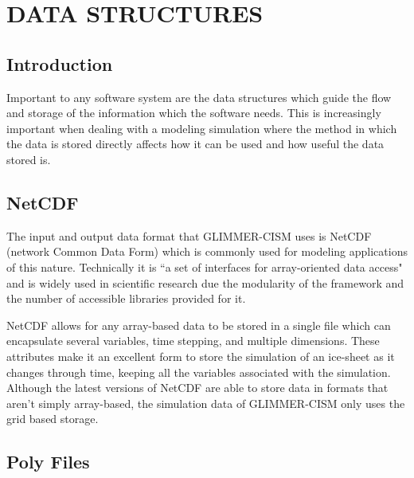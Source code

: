 \section{DATA STRUCTURES}\label{ch:modelinput}


\subsection{Introduction}\label{sec:chp3intro}

Important to any software system are the data structures which guide the flow and storage of the information which the software needs.  This is increasingly important when dealing with a modeling simulation where the method in which the data is stored directly affects how it can be used and how useful the data stored is.

\subsection{NetCDF}\label{sec:chp3netcdf}

The input and output data format that GLIMMER-CISM uses is NetCDF (network Common Data Form) which is commonly used for modeling applications of this nature.  Technically it is ``a set of interfaces for array-oriented data access" and is widely used in scientific research due the modularity of the framework and the number of accessible libraries provided for it. \citep{NetCDF:website}

NetCDF allows for any array-based data to be stored in a single file which can encapsulate several variables, time stepping, and multiple dimensions.  These attributes make it an excellent form to store the simulation of an ice-sheet as it changes through time, keeping all the variables associated with the simulation.  Although the latest versions of NetCDF are able to store data in formats that aren't simply array-based, the simulation data of GLIMMER-CISM only uses the grid based storage.



\subsection{Poly Files}\label{sec:chp3poly}

